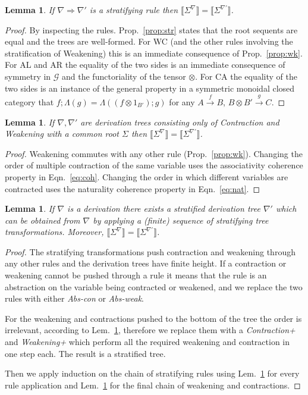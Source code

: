 \documentclass{article}
\newcommand{\sbr}[1]{\llbracket {#1}\rrbracket}
\newtheorem{lemma}[theorem]{Lemma}
\begin{document}
\begin{lemma} \label{lem:streq}
If $\nabla\Rightarrow\nabla'$ is a stratifying rule then $\sbr{\Sigma^\nabla}=\sbr{\Sigma^{\nabla'}}$.
\end{lemma}
\begin{proof}
By inspecting the rules. Prop.~\ref{prop:str} states that the root
sequents are equal and the trees are well-formed. For WC (and the other rules involving the
stratification of Weakening) this is an immediate consequence of
Prop.~\ref{prop:wk}. For AL and AR the equality of the two sides is an
immediate consequence of symmetry in $\mathcal G$ and the
functoriality of the tensor $\otimes$. For CA the equality of the two sides is an instance of
the general property in a symmetric monoidal closed category that $f;\Lambda(g)=\Lambda((f\otimes 1_{B'});g)$ for 
any $A\stackrel f\rightarrow B$, $B\otimes B'\stackrel g\rightarrow C$. 
\end{proof}
\begin{lemma}\label{lem:twk}
If $\nabla,\nabla'$ are   derivation trees consisting only of \emph{Contraction} and \emph{Weakening} with
a common root $\Sigma$ then
$\sbr{\Sigma^\nabla}=\sbr{\Sigma^{\nabla'}}$. 
\end{lemma}
\begin{proof}
Weakening commutes with any other rule (Prop.~\ref{prop:wk}).
Changing the order of multiple contraction of the same variable
  uses the associativity coherence property in Eqn.~\ref{eq:coh}.
Changing the order in which different variables are contracted
  uses the naturality coherence property in Eqn.~\ref{eq:nat}.
\end{proof}
\begin{lemma}\label{lem:streq2}
If $\nabla$ is a  derivation there exists a stratified derivation
tree $\nabla'$ which can be obtained from $\nabla$ by applying a
(finite) sequence of stratifying tree transformations. Moreover, $\sbr{\Sigma^\nabla}=\sbr{\Sigma^{\nabla'}}$.
\end{lemma}
\begin{proof}
The stratifying transformations push contraction and weakening through
any other rules and the derivation trees have finite height. If a contraction or weakening
cannot be pushed through a rule it means that the rule is an abstraction on the 
variable being contracted or weakened, and we replace the two rules with 
either \emph{Abs-con} or \emph{Abs-weak}. 

For the weakening and contractions pushed to the bottom of the tree the order
is irrelevant, according to Lem.~\ref{lem:twk}, therefore we replace them with
a \emph{Contraction+} and \emph{Weakening+} which perform all the required weakening
and contraction in one step each.
The result is a stratified  tree.

Then we
apply induction on the chain of stratifying rules using
Lem.~\ref{lem:streq} for every rule application and 
Lem.~\ref{lem:twk} for the final chain of weakening
and contractions.
\end{proof}
\end{document}

